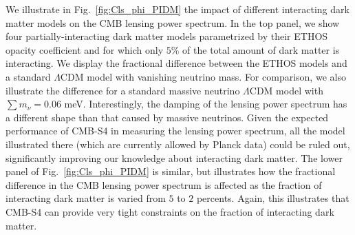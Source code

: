 We illustrate in Fig.~\ref{fig:Cls_phi_PIDM} the impact of different interacting dark matter models on the CMB lensing power spectrum. In the top panel, we show four partially-interacting dark matter models parametrized by their ETHOS opacity coefficient and for which only $5\%$ of the total amount of dark matter is interacting. We display the fractional difference between the ETHOS models and a standard $\Lambda$CDM model with vanishing neutrino mass. For comparison, we also illustrate the difference for a standard massive neutrino $\Lambda$CDM model with $\sum m_\nu = 0.06$ meV.  Interestingly, the damping of the lensing power spectrum has a different shape than that caused by massive neutrinos. Given the expected performance of CMB-S4 in measuring the lensing power spectrum, all the model illustrated there (which are currently allowed by Planck data) could be ruled out, significantly improving our knowledge about interacting dark matter. The lower panel of Fig.~\ref{fig:Cls_phi_PIDM} is similar, but illustrates how the fractional difference in the CMB lensing power spectrum is affected as the fraction of interacting dark matter is varied from $5$ to $2$ percents. Again, this illustrates that CMB-S4 can provide very tight constraints on the fraction of interacting dark matter.

